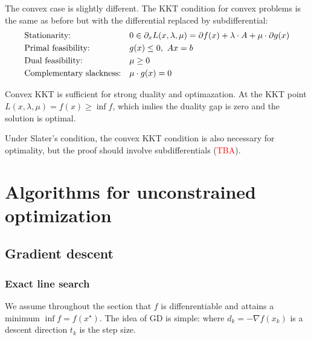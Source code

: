 \documentclass[a4paper]{mynotes}
\def\redd#1{\textcolor{red}{#1}}
\begin{document}
The convex case is slightly different. The KKT condition for convex problems is the same as before but with the differential replaced by subdifferential:
\[\begin{aligned}
&\text{Stationarity:} &&0\in \partial_x         L(x,\lambda,\mu) =\partial f(x)+\lambda\cdot A+\mu\cdot \partial g(x)\\  
&\text{Primal feasibility:} && g(x)\le 0,\ Ax=b\\
&\text{Dual feasibility:} && \mu\ge 0\\ 
&\text{Complementary slackness:} && \mu\cdot g(x)=0
\end{aligned}\]

 Convex KKT is sufficient for strong duality and optimazation. At the KKT point $L(x,\lambda,\mu)=f(x)\geq \inf f$, which imlies the duality gap is zero and the solution is optimal.

Under Slater's condition, the convex KKT condition is also necessary for optimality, but the proof should involve subdifferentials (\redd{TBA}). 
 




\chapter{Algorithms for unconstrained optimization}



\section{Gradient descent}
\subsection{Exact line search}

We assume throughout the section that $f$ is diffenrentiable and attains a minimum $\inf f=f(x^\star)$. The idea of GD is simple:
 where $d_k=-\nabla f(x_k)$ is a descent direction $t_k$ is the step size.
\end{document}

